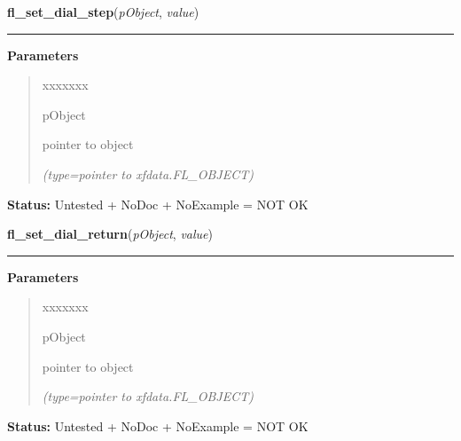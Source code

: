 \hspace{.8\funcindent}\begin{boxedminipage}{\funcwidth}

    \raggedright \textbf{fl\_set\_dial\_step}(\textit{pObject}, \textit{value})

    \vspace{-1.5ex}

    \rule{\textwidth}{0.5\fboxrule}
\setlength{\parskip}{2ex}
\setlength{\parskip}{1ex}
      \textbf{Parameters}
      \vspace{-1ex}

      \begin{quote}
        \begin{Ventry}{xxxxxxx}

          \item[pObject]

          pointer to object

            {\it (type=pointer to xfdata.FL\_OBJECT)}

        \end{Ventry}

      \end{quote}

\textbf{Status:} Untested + NoDoc + NoExample = NOT OK



    \end{boxedminipage}

    \label{xformslib:library:fl_set_dial_return}

    \vspace{0.5ex}

\hspace{.8\funcindent}\begin{boxedminipage}{\funcwidth}

    \raggedright \textbf{fl\_set\_dial\_return}(\textit{pObject}, \textit{value})

    \vspace{-1.5ex}

    \rule{\textwidth}{0.5\fboxrule}
\setlength{\parskip}{2ex}
\setlength{\parskip}{1ex}
      \textbf{Parameters}
      \vspace{-1ex}

      \begin{quote}
        \begin{Ventry}{xxxxxxx}

          \item[pObject]

          pointer to object

            {\it (type=pointer to xfdata.FL\_OBJECT)}

        \end{Ventry}

      \end{quote}

\textbf{Status:} Untested + NoDoc + NoExample = NOT OK



    \end{boxedminipage}

